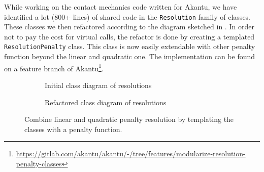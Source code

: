 \documentclass[11pt, a4paper]{article}
\begin{document}
While working on the contact mechanics code written for Akantu, we have identified a lot (800+ lines) of shared code in the \texttt{Resolution} family of classes. These classes we then refactored according to the diagram sketched in . In order not to pay the cost for virtual calls, the refactor is done by creating a templated \texttt{ResolutionPenalty} class. This class is now easily extendable with other penalty function beyond the linear and quadratic one. The implementation can be found on a feature branch of Akantu\footnote{\url{https://gitlab.com/akantu/akantu/-/tree/features/modularize-resolution-penalty-classes}}.

\begin{figure}[H]
    \centering
    \begin{subfigure}[b]{.49\linewidth}
        \centering
        
        \caption{Initial class diagram of resolutions}\label{fig:resolution-initial}
    \end{subfigure}
    \begin{subfigure}[b]{.49\linewidth}
        \centering
        
        \caption{Refactored class diagram of resolutions}\label{fig:resolution-refactor}
    \end{subfigure}
    \caption{Combine linear and quadratic penalty resolution by templating the classes
    with a penalty function.}
    \label{fig:resolution}
\end{figure}


\end{document}
